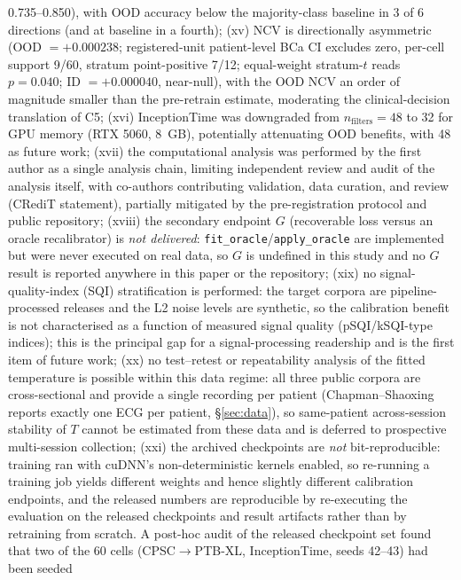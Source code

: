 \documentclass[review,12pt,nonatbib]{elsarticle}
\begin{document}
0.735--0.850), with OOD accuracy
below the majority-class baseline in 3 of 6 directions (and at baseline
in a fourth);
(xv) NCV is directionally asymmetric (OOD $= +0.000238$; registered-unit
patient-level BCa CI excludes zero, per-cell support 9/60, stratum
point-positive 7/12; equal-weight stratum-$t$ reads $p=0.040$;
ID $= +0.000040$, near-null), with the OOD NCV an order of
magnitude smaller than the pre-retrain estimate, moderating the
clinical-decision translation of C5; (xvi)
InceptionTime was downgraded from $n_{\text{filters}}=48$ to 32 for GPU
memory (RTX 5060, 8~GB), potentially attenuating OOD benefits, with 48
as future work; (xvii) the computational analysis was performed by the first
author as a single analysis chain, limiting independent review and
audit of the analysis itself, with co-authors contributing validation,
data curation, and review (CRediT statement), partially mitigated by
the pre-registration protocol and public repository; (xviii) the secondary
endpoint $G$ (recoverable loss versus an oracle recalibrator) is
\emph{not delivered}: \texttt{fit\_oracle}/\texttt{apply\_oracle} are
implemented but were never executed on real data, so $G$ is undefined in
this study and no $G$ result is reported anywhere in this paper or the
repository; (xix) no signal-quality-index (SQI) stratification is
performed: the target corpora are pipeline-processed releases and the L2
noise levels are synthetic, so the calibration benefit is not
characterised as a function of measured signal quality
(pSQI/kSQI-type indices); this is the principal gap for a
signal-processing readership and is the first item of future work;
(xx) no test--retest or repeatability analysis of the fitted temperature
is possible within this data regime: all three public corpora are
cross-sectional and provide a single recording per patient
(Chapman--Shaoxing reports exactly one ECG per patient, \S\ref{sec:data}),
so same-patient across-session stability of $T$ cannot be estimated from
these data and is deferred to prospective multi-session collection;
(xxi) the archived checkpoints are \emph{not} bit-reproducible: training
ran with cuDNN's non-deterministic kernels enabled, so re-running a
training job yields different weights and hence slightly different
calibration endpoints, and the released numbers are reproducible by
re-executing the evaluation on the released checkpoints and result
artifacts rather than by retraining from scratch. A post-hoc audit of the
released checkpoint set found that two of the 60 cells
(CPSC$\rightarrow$PTB-XL, InceptionTime, seeds 42--43) had been seeded
\end{document}
